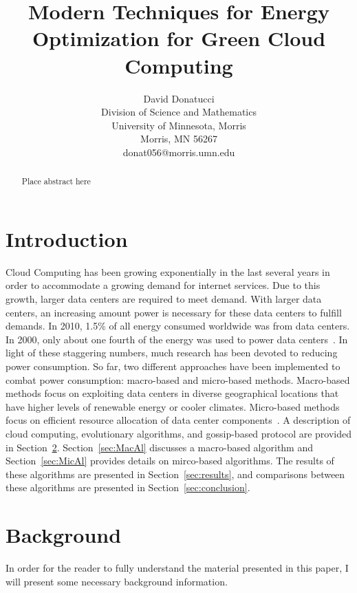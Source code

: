 \documentclass{sig-alternate}
\title{Modern Techniques for Energy Optimization for Green Cloud Computing}
\author{
\alignauthor
 		David Donatucci\\
        Division of Science and Mathematics\\
        University of Minnesota, Morris\\
        Morris, MN 56267\\
        donat056@morris.umn.edu\\
}
\date{}
\begin{document}
\pagestyle{plain}

\maketitle

\begin{abstract}

Place abstract here

\end{abstract}


\section{Introduction} \label{sec:intro}

Cloud Computing has been growing exponentially in the last several years in order to accommodate a growing demand for internet services. Due to this growth, larger data centers are required to meet demand. With larger data centers, an increasing amount power is necessary for these data centers to fulfill demands. In 2010, 1.5\% of all energy consumed worldwide was from data centers. In 2000, only about one fourth of the energy was used to power data centers~\cite{Yanggratoke}. In light of these staggering numbers, much research has been devoted to reducing power consumption. So far, two different approaches have been implemented to combat power consumption: macro-based and micro-based methods. Macro-based methods focus on exploiting data centers in diverse geographical locations that have higher levels of renewable energy or cooler climates. Micro-based methods focus on efficient resource allocation of data center components~\cite{Hassan}. A description of cloud computing, evolutionary algorithms, and gossip-based protocol are provided in Section~\ref{Background}. Section~\ref{sec:MacAl} discusses a macro-based algorithm and Section~\ref{sec:MicAl} provides details on mirco-based algorithms. The results of these algorithms are presented in Section~\ref{sec:results}, and comparisons between these algorithms are presented in Section~\ref{sec:conclusion}.

\section{Background} 
\label{Background}

In order for the reader to fully understand the material presented in this paper, I will present some necessary background information.
\end{document}
